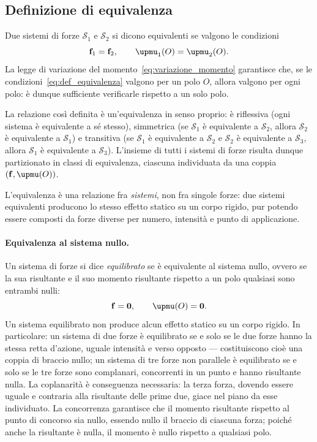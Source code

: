 \subsection{Definizione di equivalenza}

Due sistemi di forze $\mathcal{S}_1$ e $\mathcal{S}_2$ si
dicono equivalenti se valgono le condizioni
\begin{equation}\label{eq:def_equivalenza}
	\fb_{1} = \fb_{2}, \qquad
	\bm{\upmu}_{1}(O) = \bm{\upmu}_{2}(O).
\end{equation}
La legge di variazione del
momento~\eqref{eq:variazione_momento} garantisce che, se
le condizioni~\eqref{eq:def_equivalenza} valgono per un
polo $O$, allora valgono per ogni polo: è dunque
sufficiente verificarle rispetto a un solo polo.


\begin{oss}
	La relazione così definita è un'equivalenza in senso
	proprio: è riflessiva (ogni sistema è equivalente a sé
	stesso), simmetrica (se $\mathcal{S}_1$ è equivalente a
	$\mathcal{S}_2$, allora $\mathcal{S}_2$ è equivalente a
	$\mathcal{S}_1$) e transitiva (se $\mathcal{S}_1$ è
	equivalente a $\mathcal{S}_2$ e $\mathcal{S}_2$ è
	equivalente a $\mathcal{S}_3$, allora $\mathcal{S}_1$ è
	equivalente a $\mathcal{S}_3$). L'insieme di tutti i
	sistemi di forze risulta dunque partizionato in classi di
	equivalenza, ciascuna individuata da una coppia
	$(\fb, \bm{\upmu}(O))$.
\end{oss}

\begin{oss}
	L'equivalenza è una relazione fra \textit{sistemi}, non
	fra singole forze: due sistemi equivalenti producono lo
	stesso effetto statico su un corpo rigido, pur potendo
	essere composti da forze diverse per numero, intensità e
	punto di applicazione.
\end{oss}

\paragraph{Equivalenza al sistema nullo.}
Un sistema di forze si dice \textit{equilibrato} se è
equivalente al sistema nullo, ovvero se la sua risultante e il
suo momento risultante rispetto a un polo qualsiasi sono
entrambi nulli:
\begin{equation}
	\fb = \zerovb, \qquad \bm{\upmu}(O) = \zerovb.
\end{equation}
Un sistema equilibrato non produce alcun effetto statico su un
corpo rigido. In particolare: un sistema di due forze è
equilibrato se e solo se le due forze hanno la stessa retta
d'azione, uguale intensità e verso opposto --- costituiscono
cioè una coppia di braccio nullo; un sistema di tre forze non
parallele è equilibrato se e solo se le tre forze sono
complanari, concorrenti in un punto e hanno risultante nulla.
La coplanarità è conseguenza necessaria: la terza forza,
dovendo essere uguale e contraria alla risultante delle prime
due, giace nel piano da esse individuato. La concorrenza
garantisce che il momento risultante rispetto al punto di
concorso sia nullo, essendo nullo il braccio di ciascuna
forza; poiché anche la risultante è nulla, il momento è nullo
rispetto a qualsiasi polo.



